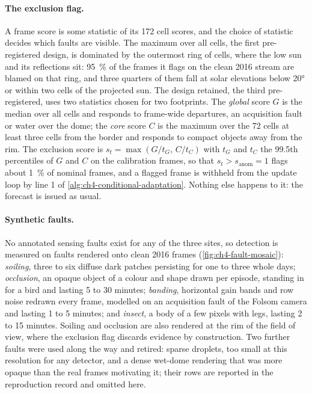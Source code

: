 \paragraph{The exclusion flag.} A frame score is some statistic of its 172 cell scores, and the choice of statistic decides which faults are visible. The maximum over all cells, the first pre-registered design, is dominated by the outermost ring of cells, where the low sun and its reflections sit: \SI{95}{\percent} of the frames it flags on the clean 2016 stream are blamed on that ring, and three quarters of them fall at solar elevations below \ang{20} or within two cells of the projected sun. The design retained, the third pre-registered, uses two statistics chosen for two footprints. The \emph{global} score $G$ is the median over all cells and responds to frame-wide departures, an acquisition fault or water over the dome; the \emph{core} score $C$ is the maximum over the 72 cells at least three cells from the border and responds to compact objects away from the rim. The exclusion score is $s_t = \max(G/t_G,\, C/t_C)$ with $t_G$ and $t_C$ the 99.5th percentiles of $G$ and $C$ on the calibration frames, so that $s_t > s_{\mathrm{anom}} = 1$ flags about \SI{1}{\percent} of nominal frames, and a flagged frame is withheld from the update loop by line 1 of \cref{alg:ch4-conditional-adaptation}. Nothing else happens to it: the forecast is issued as usual.

\paragraph{Synthetic faults.} No annotated sensing faults exist for any of the three sites, so detection is measured on faults rendered onto clean 2016 frames (\cref{fig:ch4-fault-mosaic}): \emph{soiling}, three to six diffuse dark patches persisting for one to three whole days; \emph{occlusion}, an opaque object of a colour and shape drawn per episode, standing in for a bird and lasting 5 to 30 minutes; \emph{banding}, horizontal gain bands and row noise redrawn every frame, modelled on an acquisition fault of the Folsom camera and lasting 1 to 5 minutes; and \emph{insect}, a body of a few pixels with legs, lasting 2 to 15 minutes. Soiling and occlusion are also rendered at the rim of the field of view, where the exclusion flag discards evidence by construction. Two further faults were used along the way and retired: sparse droplets, too small at this resolution for any detector, and a dense wet-dome rendering that was more opaque than the real frames motivating it; their rows are reported in the reproduction record and omitted here.

